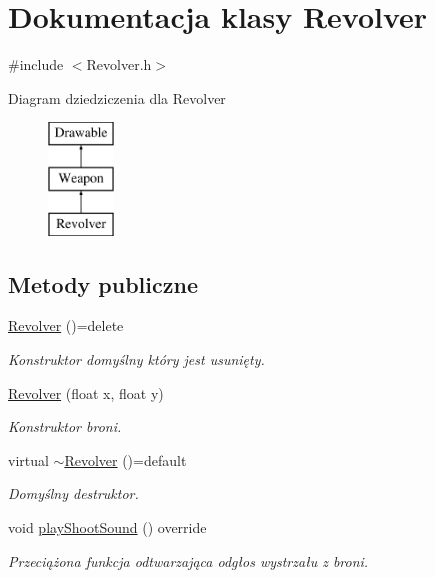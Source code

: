 \hypertarget{class_revolver}{}\section{Dokumentacja klasy Revolver}
\label{class_revolver}


{\ttfamily \#include $<$Revolver.\+h$>$}

Diagram dziedziczenia dla Revolver\begin{figure}[H]
\begin{center}
\leavevmode
\includegraphics[height=3.000000cm]{class_revolver}
\end{center}
\end{figure}
\subsection*{Metody publiczne}
\begin{DoxyCompactItemize}
\item 
\mbox{\hyperlink{class_revolver_ab4d4360bde9164e0f697a7fe3f91d8aa}{Revolver}} ()=delete
\begin{DoxyCompactList}\small\item\em Konstruktor domyślny który jest usunięty. \end{DoxyCompactList}\item 
\mbox{\hyperlink{class_revolver_a91db226199031f40f2789321108e2569}{Revolver}} (float x, float y)
\begin{DoxyCompactList}\small\item\em Konstruktor broni. \end{DoxyCompactList}\item 
virtual \mbox{\hyperlink{class_revolver_a989391a89ed1babecbc7360d670f3bc8}{$\sim$\+Revolver}} ()=default
\begin{DoxyCompactList}\small\item\em Domyślny destruktor. \end{DoxyCompactList}\item 
void \mbox{\hyperlink{class_revolver_acc5cf142969078c7ee588582cd7c9316}{play\+Shoot\+Sound}} () override
\begin{DoxyCompactList}\small\item\em Przeciążona funkcja odtwarzająca odgłos wystrzału z broni. \end{DoxyCompactList}\end{DoxyCompactItemize}
